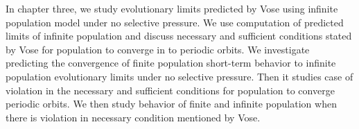 In chapter three, we study evolutionary limits predicted by Vose using infinite population model 
under no selective pressure. We use computation of predicted limits
of infinite population and discuss necessary and sufficient conditions stated by Vose for population
to converge in to periodic orbits. We investigate predicting the convergence of finite population 
short-term behavior to infinite population evolutionary limits under no selective pressure. 
Then it studies case of violation in the necessary and sufficient conditions for population 
to converge periodic orbits. We then study behavior of finite and infinite population when there is 
violation in necessary condition mentioned by Vose.






